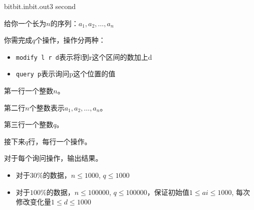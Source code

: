 \documentclass[11pt,a4paper,oneside]{article}
\begin{document}
\begin{problem}{bit}{bit.in}{bit.out}{3 second}
	
	给你一个长为$n$的序列：$a_1, a_2, \dots, a_n$
	
	你需完成$q$个操作，操作分两种：
	
	\begin{itemize}
		\item \verb|modify l r d|表示将l到r这个区间的数加上d
		\item \verb|query p|表示询问p这个位置的值 
	\end{itemize}
	
	\InputFile
	
	第一行一个整数$n$。
	
	第二行$n$个整数表示$a_1,a_2,\dots ,a_n$。
	
	第三行一个整数$q$。
	
	接下来$q$行，每行一个操作。
	
	\OutputFile
	
	对于每个询问操作，输出结果。
	
	\Example
	
	\begin{example}
\end{example}

\Note

\begin{itemize}
	\item 对于$30\%$的数据，$n \leq 1000$, $q \leq 1000$
	
	\item 对于$100\%$的数据，$n \leq 100000$, $q \leq 100000$，保证初始值$1 \leq ai \leq 1000$, 每次修改变化量$1 \leq d \leq 1000$
	
\end{itemize}

\end{problem}
\end{document}
